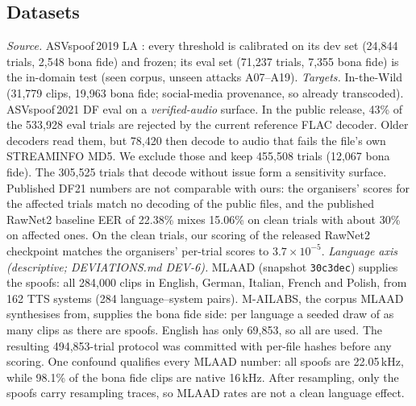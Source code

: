 \documentclass[journal]{IEEEtran}
\begin{document}
\subsection{Datasets}
\emph{Source.} ASVspoof\,2019 LA \cite{yamagishi21_asvspoof2021}: every
threshold is calibrated on its dev set (24,844 trials, 2,548 bona fide) and
frozen; its eval set (71,237 trials, 7,355 bona fide) is the in-domain test
(seen corpus, unseen attacks A07--A19).
\emph{Targets.} In-the-Wild \cite{muller22_in_the_wild} (31,779 clips, 19,963 bona
fide; social-media provenance, so already transcoded). ASVspoof\,2021 DF eval
\cite{yamagishi21_asvspoof2021} on a \emph{verified-audio} surface. In the public
release, 43\% of the 533,928 eval trials are rejected by the current reference
FLAC decoder. Older decoders read them, but 78,420 then decode to audio that
fails the file's own STREAMINFO MD5. We exclude those and keep 455,508 trials
(12,067 bona fide). The 305,525 trials that decode without issue form a
sensitivity surface. Published DF21 numbers are not comparable with ours: the
organisers' scores for the affected trials match no decoding of the public
files, and the published RawNet2 baseline EER of 22.38\% mixes 15.06\% on clean
trials with about 30\% on affected ones. On the clean trials, our scoring of the
released RawNet2 checkpoint matches the organisers' per-trial scores to
\(3.7{\times}10^{-5}\).
\emph{Language axis (descriptive; DEVIATIONS.md DEV-6).} MLAAD \cite{mlaad24}
(snapshot \texttt{30c3dec}) supplies the spoofs: all 284,000 clips in English,
German, Italian, French and Polish, from 162 TTS systems (284 language--system pairs). M-AILABS, the corpus
MLAAD synthesises from, supplies the bona fide side: per language a seeded
draw of as many clips as there are spoofs. English has only 69,853, so all are
used. The resulting 494,853-trial protocol was committed with per-file hashes
before any scoring. One confound qualifies every MLAAD number: all spoofs are
22.05\,kHz, while 98.1\% of the bona fide clips are native 16\,kHz. After
resampling, only the spoofs carry resampling traces, so MLAAD rates are not a
clean language effect.
\end{document}
